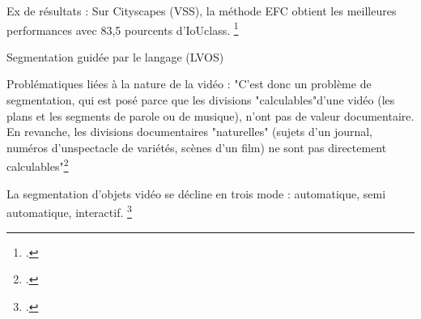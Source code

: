\begin{itemize}
Ex de résultats : Sur Cityscapes (VSS), la méthode EFC obtient les meilleures performances avec 83,5 pourcents d'IoUclass. \footcite{zhou2022}


Segmentation guidée par le langage (LVOS)



Problématiques liées à la nature de la vidéo : "C’est donc un problème de segmentation, qui est posé parce que les divisions "calculables"d’une vidéo (les plans et les segments de parole ou de musique), n’ont pas de valeur documentaire. En revanche, les divisions documentaires "naturelles" (sujets d’un journal, numéros d’unspectacle de variétés, scènes d’un ﬁlm) ne sont pas directement calculables"\footcite{zotero-item-644}



La segmentation d'objets vidéo se décline en trois mode : automatique, semi automatique, interactif. \footcite{zhou2022}


\end{itemize}
